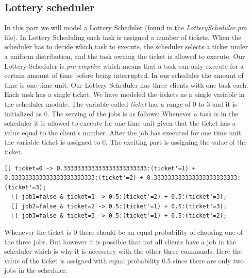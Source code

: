 \documentclass[12pt]{report}
\begin{document}
\subsection*{Lottery scheduler}
In this part we will model a Lottery Scheduler (found in the \emph{LotteryScheduler.pm} file). In Lottery Scheduling each task is assigned a number of tickets. When the scheduler has to decide which task to execute, the scheduler selects a ticket under a uniform distribution, and the task owning the ticket is allowed to execute. Our Lottery Scheduler is \emph{pre-emptive} which means that a task can only execute for a certain amount of time before being interrupted. In our scheduler the amount of time is one time unit.  Our Lottery Scheduler has three clients with one task each. Each task has a single ticket. We have modeled the tickets as a single variable in the scheduler module. The variable called \emph{ticket} has a range of 0 to 3 and it is initialized as 0. The serving of the jobs is as follows: Whenever a task is in the scheduler it is allowed to execute for one time unit given that the ticket has a value equal to the client's number. After the job has executed for one time unit the variable ticket is assigned to 0. The exciting part is assigning the value of the ticket.

\begin{lstlisting}[style=prismmodel]
  [] ticket=0 -> 0.333333333333333333333333:(ticket'=1) + 0.333333333333333333333333:(ticket'=2) + 0.333333333333333333333333:(ticket'=3);
  [] job1=false & ticket=1 -> 0.5:(ticket'=2) + 0.5:(ticket'=3);
  [] job2=false & ticket=2 -> 0.5:(ticket'=1) + 0.5:(ticket'=3);
  [] job3=false & ticket=3 -> 0.5:(ticket'=1) + 0.5:(ticket'=2);
\end{lstlisting}
Whenever the ticket is 0 there should be an equal probability of choosing one of the three jobs. But however it is possible that not all clients have a job in the scheduler which is why it is necessary with the other three commands. Here the value of the ticket is assigned with equal probability 0.5 since there are only two jobs in the scheduler.
\end{document}

